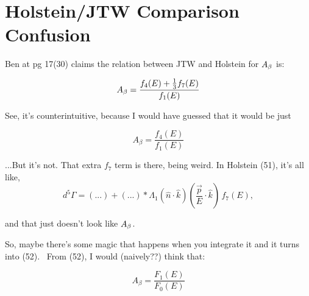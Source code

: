 


\chapter[Holstein/JTW Comparison Confusion]{Holstein/JTW Comparison Confusion}



Ben at pg 17(30) claims the relation between JTW and Holstein for $A_{\beta}$ is:

\begin{equation}
A_{\beta} = \frac{f_4(E)+ \frac{1}{3}f_7(E)}{f_1(E)}
\end{equation}

See, it's counterintuitive, because I would have guessed that it would be just

\begin{equation}
A_\beta = \frac{f_4(E)}{f_1(E)}
\end{equation}

...But it's not.  That extra $f_7$ term is there, being weird.  In Holstein (51), it's all like, 
\begin{equation}
d^5\Gamma = (...) + (...)*\Lambda_1 (\hat{n} \cdot \hat{k}) (\frac{\vec{p}}{E}\cdot \hat{k} )\,f_7(E), 
\end{equation}

and that just doesn't look like $A_{\beta}$.

So, maybe there's some magic that happens when you integrate it and it turns into (52). 
From (52), I would (naively??) think that:

\begin{equation}
A_\beta = \frac{F_1(E)}{F_0(E)}
\end{equation}

